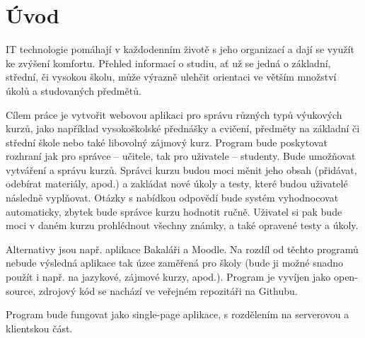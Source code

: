 \chapter{Úvod}

IT technologie pomáhají v každodenním životě s jeho organizací a dají se využít ke zvýšení
komfortu. Přehled informací o studiu, ať už se jedná o základní, střední, či vysokou školu, může výrazně ulehčit orientaci ve větším množství úkolů a studovaných předmětů.

Cílem práce je vytvořit webovou aplikaci pro správu různých typů výukových kurzů, jako například vysokoškolské přednášky a cvičení, předměty na základní či střední škole nebo také libovolný zájmový kurz. Program bude poskytovat rozhraní jak pro správce – učitele, tak pro uživatele – studenty. Bude umožňovat vytváření a správu kurzů. Správci kurzu budou moci měnit jeho obsah (přidávat, odebírat materiály, apod.) a zakládat nové úkoly a testy, které budou uživatelé následně vyplňovat. Otázky s nabídkou odpovědí bude systém vyhodnocovat automaticky, zbytek bude správce kurzu hodnotit ručně. Uživatel si pak bude moci v daném kurzu prohlédnout všechny známky, a také opravené testy a úkoly.

Alternativy jsou např. aplikace Bakaláři a Moodle. Na rozdíl od těchto programů nebude výsledná aplikace tak úzce zaměřená pro školy (bude ji možné snadno použít i např. na jazykové, zájmové kurzy, apod.).
Program je vyvíjen jako open-source, zdrojový kód se nachází ve veřejném repozitáři na Githubu.

Program bude fungovat jako single-page aplikace, s rozdělením na serverovou a klientskou část. 